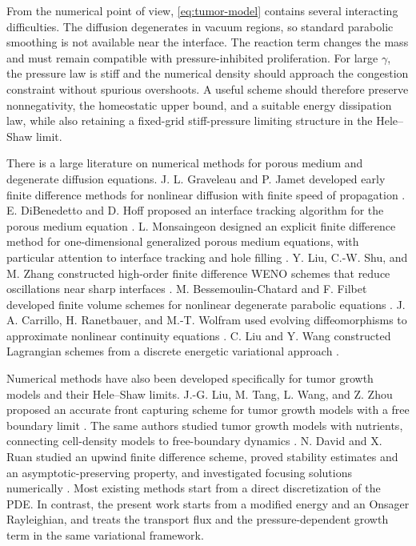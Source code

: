 \documentclass[11pt]{article}
\theoremstyle{plain}
\numberwithin{equation}{section}
\begin{document}
From the numerical point of view, \eqref{eq:tumor-model} contains several
interacting difficulties. The diffusion degenerates in vacuum regions, so
standard parabolic smoothing is not available near the interface. The
reaction term changes the mass and must remain compatible with
pressure-inhibited proliferation. For large \(\gamma\), the pressure law is
stiff and the numerical density should approach the congestion constraint
without spurious overshoots. A useful scheme should therefore preserve
nonnegativity, the homeostatic upper bound, and a suitable energy
dissipation law, while also retaining a fixed-grid stiff-pressure limiting
structure in the Hele--Shaw limit.

There is a large literature on numerical methods for porous medium and
degenerate diffusion equations. J. L. Graveleau and P. Jamet developed early
finite difference methods for nonlinear diffusion with finite speed of
propagation \cite{GraveleauJamet1971}. E. DiBenedetto and D. Hoff proposed
an interface tracking algorithm for the porous medium equation
\cite{DiBenedettoHoff1984}. L. Monsaingeon designed an explicit finite
difference method for one-dimensional generalized porous medium equations,
with particular attention to interface tracking and hole filling
\cite{Monsaingeon2016}. Y. Liu, C.-W. Shu, and M. Zhang constructed
high-order finite difference WENO schemes that reduce oscillations near
sharp interfaces \cite{LiuShuZhang2011}. M. Bessemoulin-Chatard and F.
Filbet developed finite volume schemes for nonlinear degenerate parabolic
equations \cite{BessemoulinFilbet2012}. J. A. Carrillo, H. Ranetbauer, and
M.-T. Wolfram used evolving diffeomorphisms to approximate nonlinear
continuity equations \cite{CarrilloRanetbauerWolfram2016}. C. Liu and Y.
Wang constructed Lagrangian schemes from a discrete energetic variational
approach \cite{LiuWang2020}.


Numerical methods have also been developed specifically for tumor growth
models and their Hele--Shaw limits. J.-G. Liu, M. Tang, L. Wang, and Z.
Zhou proposed an accurate front capturing scheme for tumor growth models
with a free boundary limit \cite{LiuTangWangZhou2018}. The same authors studied tumor growth models with nutrients,
connecting cell-density models to free-boundary dynamics \cite{LiuTangWangZhou2019}. N. David and
X. Ruan studied an upwind finite difference scheme, proved stability
estimates and an asymptotic-preserving property, and investigated focusing
solutions numerically \cite{DavidRuan2022}. Most existing methods start
from a direct discretization of the PDE. In contrast, the present work
starts from a modified energy and an Onsager Rayleighian, and treats the
transport flux and the pressure-dependent growth term in the same
variational framework.
\end{document}
